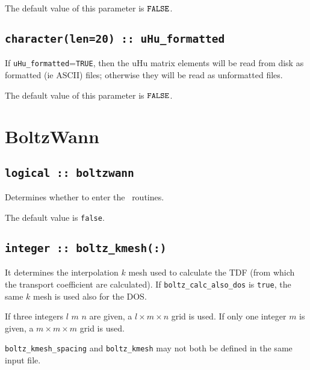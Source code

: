 The default value of this parameter is $\verb#FALSE#$.

\subsection[uHu\_formated]{\tt character(len=20) :: uHu\_formatted}

If \verb#uHu_formatted#=\verb#TRUE#, then the uHu matrix elements will be
read from disk as formatted (ie ASCII) files; otherwise they will be
read as unformatted files.

The default value of this parameter is $\verb#FALSE#$.







\clearpage
\section{BoltzWann}
\subsection[boltzwann]{\tt logical :: boltzwann}
Determines whether to enter the \bw\ routines.

The default value is \verb#false#.

\subsection[boltz\_kmesh]{\tt integer :: boltz\_kmesh(:)}
It determines the interpolation $k$ mesh used to calculate the TDF (from which the transport coefficient are calculated). If {\tt boltz\_calc\_also\_dos} is \verb#true#, the same $k$ mesh is used also for the DOS.

If three integers $l$ $m$ $n$ are given, a $l\times m\times n$ grid is used. If only one integer $m$ is given, a $m\times m\times m$ grid is used.

{\tt boltz\_kmesh\_spacing} and  {\tt boltz\_kmesh} may not both be defined in the same input file.

